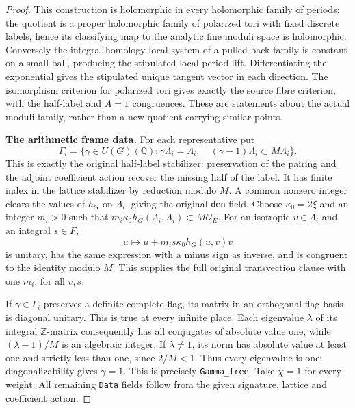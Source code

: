 \begin{proof}
This construction is holomorphic in every holomorphic family of
periods: the quotient is a proper holomorphic family of polarized
tori with fixed discrete labels, hence its classifying map to the
analytic fine moduli space is holomorphic.  Conversely the integral
homology local system of a pulled-back family is constant on a
small ball, producing the stipulated local period lift.  Differentiating
the exponential gives the stipulated unique tangent vector in
each direction.  The isomorphism criterion for polarized tori
gives exactly the source fibre criterion, with the half-label
and $A=1$ congruences.  These are statements about the actual
moduli family, rather than a new quotient carrying similar points.

\par\medskip\noindent\textbf{The arithmetic frame data.}
For each representative put
\[
 \Gamma_i=\{\gamma\in U(G)(\mathbb Q):
       \gamma\Lambda_i=\Lambda_i,\quad
       (\gamma-1)\Lambda_i\subset M\Lambda_i\}.
\]
This is exactly the original half-label stabilizer: preservation
of the pairing and the adjoint coefficient action recover the
missing half of the label.  It has finite index in the lattice
stabilizer by reduction modulo $M$.  A common nonzero integer
clears the values of $h_G$ on $\Lambda_i$, giving the original
\texttt{den} field.  Choose $\kappa_0=2\xi$ and an integer
$m_i>0$ such that
$m_i\kappa_0h_G(\Lambda_i,\Lambda_i)\subset M\mathcal O_E$.
For an isotropic $v\in\Lambda_i$ and an integral $s\in F$,
\[
     u\longmapsto u+m_i s\kappa_0 h_G(u,v)v
\]
is unitary, has the same expression with a minus sign as inverse,
and is congruent to the identity modulo $M$.  This supplies the
full original transvection clause with one $m_i$, for all $v,s$.

If $\gamma\in\Gamma_i$ preserves a definite complete flag, its
matrix in an orthogonal flag basis is diagonal unitary.  This is
true at every infinite place.  Each eigenvalue $\lambda$ of its
integral $\mathbb Z$-matrix consequently has all conjugates of
absolute value one, while $(\lambda-1)/M$ is an algebraic integer.
If $\lambda\ne1$, its norm has absolute value at least one and
strictly less than one, since $2/M<1$.  Thus every eigenvalue is
one; diagonalizability gives $\gamma=1$.  This is precisely
\texttt{Gamma\_free}.  Take $\chi=1$ for every weight.  All remaining
\texttt{Data} fields follow from the given signature, lattice and
coefficient action.


\end{proof}
